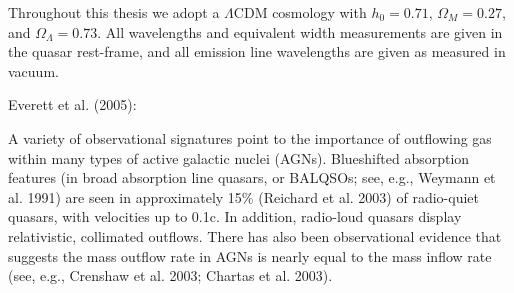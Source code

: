 Throughout this thesis we adopt a $\Lambda$CDM cosmology with $h_0=0.71$, $\Omega_M=0.27$, and $\Omega_\Lambda=0.73$. 
All wavelengths and equivalent width measurements are given in the quasar rest-frame, and all emission line wavelengths are given as measured in vacuum.

Everett et al. (2005): 

A variety of observational signatures point to the importance of outflowing gas within many types of active galactic nuclei (AGNs). Blueshifted absorption features (in broad absorption line quasars, or BALQSOs; see, e.g., Weymann et al. 1991) are seen in approximately 15\% (Reichard et al. 2003) of radio-quiet quasars, with velocities up to 0.1c. In addition, radio-loud quasars display relativistic, collimated outflows. 
There has also been observational evidence that suggests the mass outflow rate in AGNs is nearly equal to the mass inflow rate (see, e.g., Crenshaw et al. 2003; Chartas et al. 2003).
